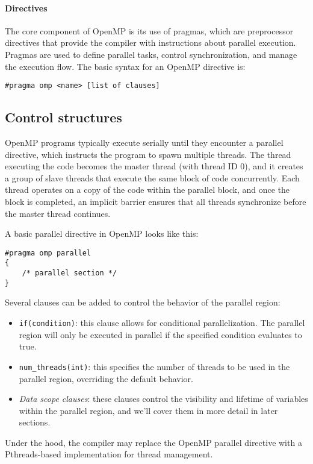 \paragraph*{Directives}
The core component of OpenMP is its use of pragmas, which are preprocessor directives that provide the compiler with instructions about parallel execution. 
Pragmas are used to define parallel tasks, control synchronization, and manage the execution flow. 
The basic syntax for an OpenMP directive is:
\begin{lstlisting}[style=C]
#pragma omp <name> [list of clauses]
\end{lstlisting}

\subsection{Control structures}
OpenMP programs typically execute serially until they encounter a parallel directive, which instructs the program to spawn multiple threads. 
The thread executing the code becomes the master thread (with thread ID 0), and it creates a group of slave threads that execute the same block of code concurrently. 
Each thread operates on a copy of the code within the parallel block, and once the block is completed, an implicit barrier ensures that all threads synchronize before the master thread continues.

A basic parallel directive in OpenMP looks like this:
\begin{lstlisting}[style=C]
#pragma omp parallel 
{
    /* parallel section */
}
\end{lstlisting}
Several clauses can be added to control the behavior of the parallel region:
\begin{itemize}
    \item \texttt{if(condition)}: this clause allows for conditional parallelization. 
        The parallel region will only be executed in parallel if the specified condition evaluates to true.
    \item \texttt{num\_threads(int)}: this specifies the number of threads to be used in the parallel region, overriding the default behavior.
    \item \textit{Data scope clauses}: these clauses control the visibility and lifetime of variables within the parallel region, and we'll cover them in more detail in later sections.
\end{itemize}
Under the hood, the compiler may replace the OpenMP parallel directive with a Pthreads-based implementation for thread management.

